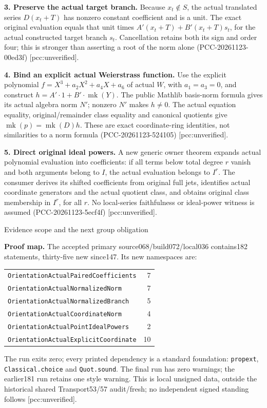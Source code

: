 \documentclass[11pt]{article}
\begin{document}
\textbf{3. Preserve the actual target branch.}
Because \(x_t\notin S\), the actual translated series \(D(x_t+T)\) has
nonzero constant coefficient and is a unit.
The exact original evaluation equals that unit times
\(A'(x_t+T)+B'(x_t+T)s_t\), for the actual constructed target branch \(s_t\).
Cancellation retains both its sign and order four; this is stronger than
asserting a root of the norm alone (PCC-20261123-00ed3f) [pcc:unverified].

\textbf{4. Bind an explicit actual Weierstrass function.}
Use the explicit polynomial \(f=X^3+a_2X^2+a_4X+a_6\) of actual \(W\),
with \(a_1=a_3=0\), and construct
\(h=A'\cdot1+B'\cdot\operatorname{mk}(Y)\).
The public Mathlib basis-norm formula gives its actual algebra norm \(N'\);
nonzero \(N'\) makes \(h\ne0\). The actual equation equality, original/remainder
class equality and canonical quotients give
\(\operatorname{mk}(p)=\operatorname{mk}(D)h\).
These are exact coordinate-ring identities, not similarities to a norm formula
(PCC-20261123-524105) [pcc:unverified].

\textbf{5. Direct original ideal powers.}
A new generic owner theorem expands actual polynomial evaluation into
coefficients: if all terms below total degree \(r\) vanish and both arguments
belong to \(I\), the actual evaluation belongs to \(I^r\).
The consumer derives its shifted coefficients from original full jets,
identifies actual coordinate generators and the actual quotient class,
and obtains original class membership in \(I^r\), for all \(r\).
No local-series faithfulness or ideal-power witness is assumed
(PCC-20261123-5ecf4f) [pcc:unverified].

\newpage
\begin{center}{\Large Evidence scope and the next group obligation}\end{center}

\textbf{Proof map.}
The accepted primary source068/build072/local036 contains182 statements,
thirty-five new since147. Its new namespaces are:
\begin{center}
\begin{tabular}{lr}
\texttt{OrientationActualPairedCoefficients}&7\\
\texttt{OrientationActualNormalizedNorm}&7\\
\texttt{OrientationActualNormalizedBranch}&5\\
\texttt{OrientationActualCoordinateNorm}&4\\
\texttt{OrientationActualPointIdealPowers}&2\\
\texttt{OrientationActualExplicitCoordinate}&10
\end{tabular}
\end{center}
The run exits zero; every printed dependency is a standard foundation:
\texttt{propext}, \texttt{Classical.choice} and \texttt{Quot.sound}.
The final run has zero warnings; the earlier181 run retains one style warning.
This is local unsigned data, outside the historical shared Transport53/57
audit/fresh; no independent signed standing follows [pcc:unverified].
\end{document}
